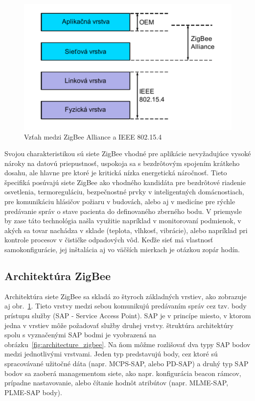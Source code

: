 \begin{figure}[htbp]
\begin{center}
\includegraphics[width=140mm]{figures/zigbee_ieee}
\caption{Vzťah medzi ZigBee Alliance a IEEE 802.15.4}
\label{fig:zigbee_ieee}
\end{center}
\end{figure}

\indent Svojou charakteristikou sú siete ZigBee vhodné pre aplikácie nevyžadujúce vysoké nároky na datovú priepustnosť, uspokoja sa s bezdrôtovým spojením krátkeho dosahu, ale hlavne pre ktoré je kritická nízka energetická náročnosť. Tieto špecifiká posúvajú siete ZigBee ako vhodného kandidáta pre bezdrôtové riadenie osvetlenia, termoreguláciu, bezpečnostné prvky v inteligentných domácnostiach, pre komunikáciu hlásičov požiaru v budovách, alebo aj v medicíne pre rýchle predávanie správ o stave pacienta do definovaného zberného bodu. V priemysle by zase táto technológia našla využitie napríklad v monitorovaní podmienok, v akých sa tovar nachádza v sklade (teplota, vlhkosť, vibrácie), alebo napríklad pri kontrole procesov v čističke odpadových vôd. Keďže sieť má vlastnosť samokonfigurácie, jej inštalácia aj vo väčších mierkach je otázkou zopár hodín.\\

\subsection{Architektúra ZigBee}
\indent\indent Architektúra siete ZigBee sa skladá zo štyroch základných vrstiev, ako zobrazuje aj obr.~\ref{fig:zigbee_ieee}. Tieto vrstvy medzi sebou komunikujú predávaním správ cez tzv. body prístupu služby (SAP - Service Access Point). SAP je v princípe miesto, v ktorom jedna v vrstiev môže požadovať služby druhej vrstvy. štruktúra architektúry spolu s vyznačenými SAP bodmi je vyobrazená na obrázku~\ref{fig:architecture_zigbee}. Na ňom môžme rozlišovať dva typy SAP bodov medzi jednotlivými vrstvami. Jeden typ predstavujú body, cez ktoré sú spracovávané užitočné dáta (napr. MCPS-SAP, alebo PD-SAP) a druhý typ SAP bodov sa zaoberá managementom siete, ako napr. konfigurácia beacon rámcov, prípadne nastavovanie, alebo čítanie hodnôt atribútov (napr. MLME-SAP, PLME-SAP body).\\

